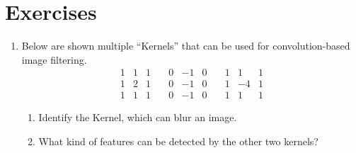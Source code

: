 \section*{Exercises}\small
\begin{enumerate}
\item Below are shown multiple ``Kernels'' that can be used for convolution-based image filtering. 
\begin{equation}
\nonumber
\begin{array}{|c|c|c}
\hline
1 & 1 & 1\\
\hline
1 & 2 & 1\\
\hline
1 & 1 & 1
\end{array}
\quad
\begin{array}{|c|c|c}
\hline
0 & -1 & 0\\
\hline
0 & -1 & 0\\
\hline
0 & -1 & 0
\end{array}
\quad
\begin{array}{|c|c|c}
\hline
1 & 1 & 1\\
\hline
1 & -4 & 1\\
\hline
1 & 1 & 1
\end{array}
\end{equation}
\begin{enumerate}
\item Identify the Kernel, which can blur an image.
\item What kind of features can be detected by the other two kernels?
\end{enumerate}
\end{enumerate} \normalsize